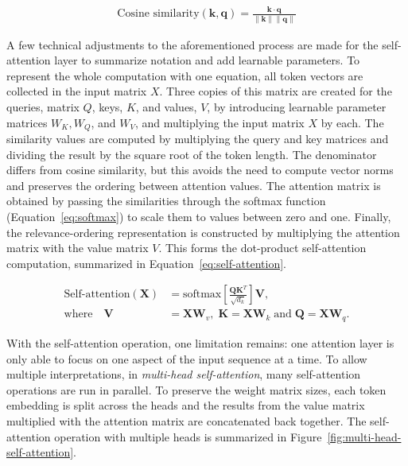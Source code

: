 \documentclass[english,twoside,openright]{UH_DS_MSc}
\begin{document}
\begin{align}
    \text{Cosine similarity}(\mathbf{k}, \mathbf{q}) = \frac{\mathbf{k} \cdot \mathbf{q}}{\|\mathbf{k}\| \|\mathbf{q}\|}
    \label{eq:cos-similarity}
\end{align}

A few technical adjustments to the aforementioned process are made for the self-attention layer to summarize notation and add learnable parameters. To represent the whole computation with one equation, all token vectors are collected in the input matrix $X$. Three copies of this matrix are created for the queries, matrix $Q$, keys, $K$, and values, $V$, by introducing learnable parameter matrices $W_K, W_Q$, and $W_V$, and multiplying the input matrix $X$ by each. The similarity values are computed by multiplying the query and key matrices and dividing the result by the square root of the token length. The denominator differs from cosine similarity, but this avoids the need to compute vector norms and preserves the ordering between attention values. The attention matrix is obtained by passing the similarities through the softmax function (Equation~\ref{eq:softmax}) to scale them to values between zero and one. Finally, the relevance-ordering representation is constructed by multiplying the attention matrix with the value matrix $V$. This forms the dot-product self-attention computation, summarized in Equation~\ref{eq:self-attention}.

\begin{align}
    \text{Self-attention}(\mathbf{X}) &= \text{softmax} \left[ \frac{\mathbf{Q}\mathbf{K}^T }{\sqrt{d_k}} \right] \mathbf{V}, \label{eq:self-attention} \\
    \nonumber\text{where} \quad \mathbf{V} &= \mathbf{X} \mathbf{W}_v, \; \mathbf{K} = \mathbf{X} \mathbf{W}_k \; \text{and} \; \mathbf{Q} = \mathbf{X} \mathbf{W}_q.
\end{align}

With the self-attention operation, one limitation remains: one attention layer is only able to focus on one aspect of the 
input sequence at a time. To allow multiple interpretations, in \textit{multi-head self-attention}, many self-attention operations are run in parallel. To preserve the weight matrix sizes, each token embedding is split across the heads and the 
results from the value matrix multiplied with the attention matrix are concatenated back together. The self-attention operation with multiple heads is summarized in Figure~\ref{fig:multi-head-self-attention}.
\end{document}
